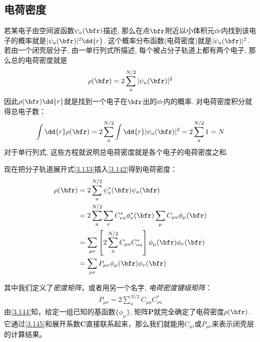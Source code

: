 \subsection{电荷密度}
若某电子由空间波函数$\psi_a(\bfr)$描述, 那么在点$\bfr$附近以小体积元$\dd{r}$内找到该电子的概率就是$|\psi_a(\bfr)|^2\dd{r}$. 这个概率分布函数(电荷密度)就是$|\psi_a(\bfr)|^2$. 若由一个闭壳层分子, 由一单行列式所描述, 每个被占分子轨道上都有两个电子, 那么总的电荷密度就是
\begin{align}
\label{3.142}
\rho(\bfr) = 2 \sum_{a}^{N/2} |\psi_a(\bfr)|^2
\end{align}
因此$\rho(\bfr)\dd{r}$就是找到一个电子在$\bfr$出的$\dd{r}$内的概率. 对电荷密度积分就得总电子数：
\begin{align}
\int\dd{r}\rho(\bfr) = 2 \sum_{a}^{N/2} \int\dd{r}|\psi_a(\bfr)|^2 = 2\sum_{a}^{N/2}1=N
\end{align}
对于单行列式, 这些方程就说明总电荷密度就是各个电子的电荷密度之和.

现在把分子轨道展开式\eqref{3.133}插入\eqref{3.142}得到电荷密度：
\begin{align}
\rho(\bfr) & = 2\sum_{a}^{N/2}\psi_a^*(\bfr)\psi_a(\bfr) \notag\\
		   & = 2\sum_{a}^{N/2}\sum_{v} C_{\nu a}^*\phi_\nu^*(\bfr)\sum_{\mu}C_{\mu a}\phi_\mu(\bfr) \notag\\
		   & = \sum_{\mu\nu}\left[ 2\sum_{a}^{N/2}C_{\mu a}C_{\nu a}^* \right]\phi_\mu(\bfr)\phi_\nu(\bfr) \notag\\
		   & = \sum_{\mu\nu}P_{\mu\nu} \phi_\mu(\bfr)\phi_\nu(\bfr)
\label{3.144}
\end{align}

其中我们定义了\emph{密度矩阵}，或者用另一个名字, \emph{电荷密度键级矩阵}：
\begin{align}
P_{\mu\nu} = 2\sum_{a}^{N/2}C_{\mu a}C_{\nu a}^*
\label{3.145}
\end{align}
由\eqref{3.144}知，给定一组已知的基函数$\{\phi_\mu\}$, 矩阵$\mathbf{P}$就完全确定了电荷密度$\rho(\bfr)$. 它通过\eqref{3.145}和展开系数$\mathbf{C}$直接联系起来，那么我们就能用$C_{\mu i}$或$P_{\mu\nu}$来表示闭壳层\hft 的计算结果。

